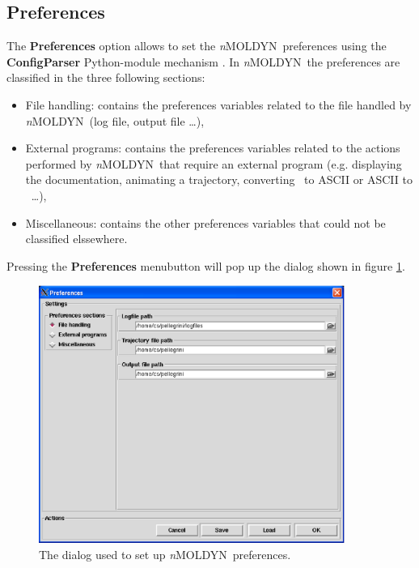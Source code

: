 \documentclass[a4paper,11pt]{report}
\newcommand{\NMOLDYN}{\textit{n}MOLDYN}
\begin{document}
\subsection{Preferences}
\label{preferences}
The \textbf{Preferences} option allows to set the \NMOLDYN\ preferences using the \textbf{ConfigParser} Python-module mechanism 
\cite{ConfigParser}. In \NMOLDYN\, the preferences are classified in the three following sections:
\begin{itemize}
\item File handling: contains the preferences variables related to the file handled by \NMOLDYN\ (log file, output file \ldots ),
\item External programs: contains the preferences variables related to the actions performed by \NMOLDYN\ that require 
an external program (e.g. displaying the documentation, animating a trajectory, converting \NetCDF\ to ASCII or ASCII 
to \NetCDF\ \ldots ),
\item Miscellaneous: contains the other preferences variables that could not be classified elssewhere.
\end{itemize}
Pressing the \textbf{Preferences} menubutton will pop up the dialog shown in figure \ref{fig:preferences_file_handling}. 
\begin{figure}[h!]
\begin{center}
\includegraphics[width=10cm]{Figures/preferences_file_handling.eps}
\end{center}
\caption[The Preferences dialog]{The dialog used to set up \NMOLDYN\ preferences.}
\label{fig:preferences_file_handling}
\end{figure}   
\end{document}
